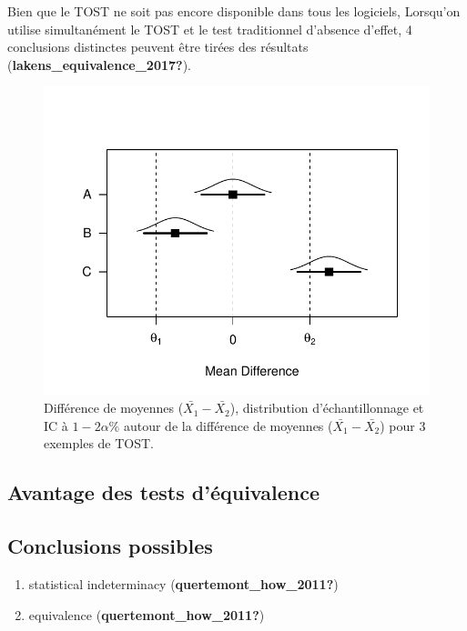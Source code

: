 \documentclass[
  english,
  man]{apa6}
\providecommand{\tightlist}{%
  \setlength{\itemsep}{0pt}\setlength{\parskip}{0pt}}
\begin{document}
Bien que le TOST ne soit pas encore disponible dans tous les logiciels,
Lorsqu'on utilise simultanément le TOST et le test traditionnel d'absence d'effet, 4 conclusions distinctes peuvent être tirées des résultats (\textbf{lakens\_equivalence\_2017?}).

\begin{figure}

{\centering \includegraphics{chp5_files/figure-latex/equiv1-1} 

}

\caption{Différence de moyennes ($\bar{X_1}-\bar{X_2}$), distribution d'échantillonnage et IC à $1-2\alpha\%$ autour de la différence de moyennes ($\bar{X_1}-\bar{X_2}$) pour 3 exemples de TOST.}\label{fig:equiv1}
\end{figure}

\hypertarget{avantage-des-tests-duxe9quivalence}{%
\subsection{Avantage des tests d'équivalence}\label{avantage-des-tests-duxe9quivalence}}

\hypertarget{conclusions-possibles}{%
\subsection{Conclusions possibles}\label{conclusions-possibles}}

\begin{enumerate}
\def\labelenumi{\arabic{enumi})}
\tightlist
\item
  statistical indeterminacy (\textbf{quertemont\_how\_2011?})
\item
  equivalence (\textbf{quertemont\_how\_2011?})
\end{enumerate}
\end{document}
